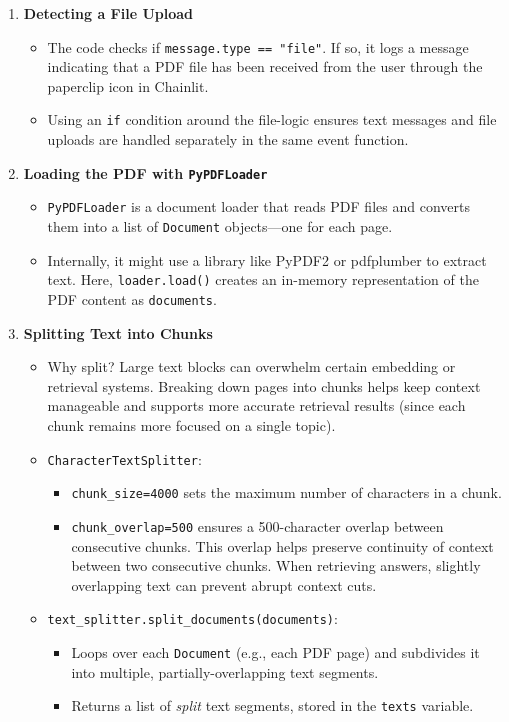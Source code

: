 \begin{enumerate}
    \item \textbf{Detecting a File Upload}
    \begin{itemize}
        \item The code checks if \texttt{message.type == "file"}. If so, it logs a message indicating that a PDF file has been received from the user through the paperclip icon in Chainlit.
        \item Using an \texttt{if} condition around the file-logic ensures text messages and file uploads are handled separately in the same event function.
    \end{itemize}

    \item \textbf{Loading the PDF with \texttt{PyPDFLoader}}
    \begin{itemize}
        \item \texttt{PyPDFLoader} is a document loader that reads PDF files and converts them into a list of \texttt{Document} objects—one for each page. 
        \item Internally, it might use a library like PyPDF2 or pdfplumber to extract text. Here, \texttt{loader.load()} creates an in-memory representation of the PDF content as \texttt{documents}.
    \end{itemize}

    \item \textbf{Splitting Text into Chunks}
    \begin{itemize}
        \item Why split? Large text blocks can overwhelm certain embedding or retrieval systems. Breaking down pages into chunks helps keep context manageable and supports more accurate retrieval results (since each chunk remains more focused on a single topic).
        \item \texttt{CharacterTextSplitter}:
        \begin{itemize}
          \item \texttt{chunk\_size=4000} sets the maximum number of characters in a chunk.
          \item \texttt{chunk\_overlap=500} ensures a 500-character overlap between consecutive chunks. This overlap helps preserve continuity of context between two consecutive chunks. When retrieving answers, slightly overlapping text can prevent abrupt context cuts.
        \end{itemize}
        \item \texttt{text\_splitter.split\_documents(documents)}:
        \begin{itemize}
            \item Loops over each \texttt{Document} (e.g., each PDF page) and subdivides it into multiple, partially-overlapping text segments.
            \item Returns a list of \textit{split} text segments, stored in the \texttt{texts} variable. 
        \end{itemize}
    \end{itemize}


\end{enumerate}

